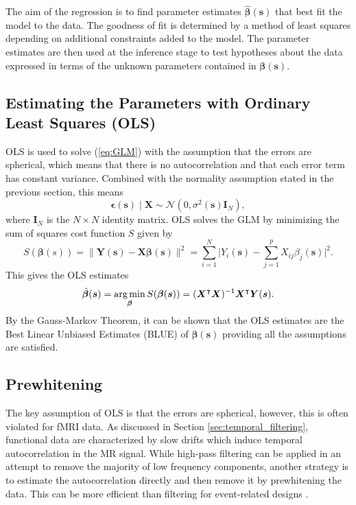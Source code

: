 The aim of the regression is to find parameter estimates $\bm{\hat{\beta}}(\bm{s})$ that best fit the model to the data. The goodness of fit is determined by a method of least squares depending on additional constraints added to the model. The parameter estimates are then used at the inference stage to test hypotheses about the data expressed in terms of the unknown parameters contained in $\bm{\beta}(\bm{s})$.

\subsection{Estimating the Parameters with Ordinary Least Squares (OLS)} 
\label{sec:OLS}

OLS is used to solve (\ref{eq:GLM}) with the assumption that the errors are spherical, which means that there is no autocorrelation and that each error term has constant variance. Combined with the normality assumption stated in the previous section, this means
\begin{equation}
\label{eq:OLS_errors}
\bm{\epsilon}(\bm{s}) \mid \bm{X} \sim  \mathcal{N}(0, \sigma^{2}(\bm{s})\bm{I}_{N}),
\end{equation}
where $\bm{I}_{N}$ is the $N \times N$ identity matrix. OLS solves the GLM by minimizing the sum of squares cost function $S$ given by
\begin{equation}
\label{eq:OLS_cost}
S(\bm{\beta}(s))  = \lVert \bm{Y}(\bm{s}) - \bm{X}\bm{\beta}(\bm{s}) \rVert^{2} = \sum_{i = 1}^{N} \lvert Y_i(\bm{s}) - \sum_{j = 1}^{p} X_{ij} \beta_j (\bm{s}) \rvert ^{2}.
\end{equation}
This gives the OLS estimates
\begin{equation}
\label{eq:OLS_estimates}
\hat{\bm{\beta}}(\bm{s}) = \operatorname*{arg\,min}_{\bm{\beta}} S(\bm{\beta}(\bm{s})) = (\bm{X}^{\intercal}\bm{X})^{-1}\bm{X}^{\intercal}\bm{Y}(\bm{s}).
\end{equation}
By the Gauss-Markov Theorem, it can be shown that the OLS estimates are the Best Linear Unbiased Estimates (BLUE) of $\bm{\beta}(\bm{s})$ providing all the assumptions are satisfied. 

\subsection{Prewhitening}
\label{sec:prewhitening}

The key assumption of OLS is that the errors are spherical, however, this is often violated for fMRI data. As discussed in Section \ref{sec:temporal_filtering}, functional data are characterized by slow drifts which induce temporal autocorrelation in the MR signal. While high-pass filtering can be applied in an attempt to remove the majority of low frequency components, another strategy is to estimate the autocorrelation directly and then remove it by prewhitening the data. This can be more efficient than filtering for event-related designs \citep{Woolrich2001-tk}.

